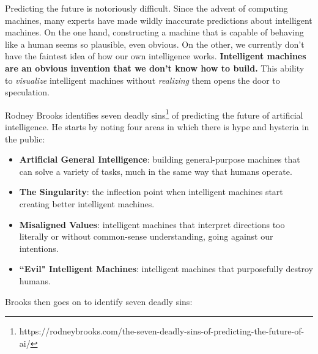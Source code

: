 Predicting the future is notoriously difficult. Since the advent of computing machines, many experts have made wildly inaccurate predictions about intelligent machines. On the one hand, constructing a machine that is capable of behaving like a human seems so plausible, even obvious. On the other, we currently don't have the faintest idea of how our own intelligence works. \textbf{Intelligent machines are an obvious invention that we don't know how to build.} This ability to \textit{visualize} intelligent machines without \textit{realizing} them opens the door to speculation.

Rodney Brooks identifies seven deadly sins\footnote{https://rodneybrooks.com/the-seven-deadly-sins-of-predicting-the-future-of-ai/} of predicting the future of artificial intelligence. He starts by noting four areas in which there is hype and hysteria in the public:
\begin{itemize}
	\item \textbf{Artificial General Intelligence}: building general-purpose machines that can solve a variety of tasks, much in the same way that humans operate.
	\item \textbf{The Singularity}: the inflection point when intelligent machines start creating better intelligent machines.
	\item \textbf{Misaligned Values}: intelligent machines that interpret directions too literally or without common-sense understanding, going against our intentions.
	\item \textbf{``Evil" Intelligent Machines}: intelligent machines that purposefully destroy humans.
\end{itemize}
Brooks then goes on to identify seven deadly sins:

